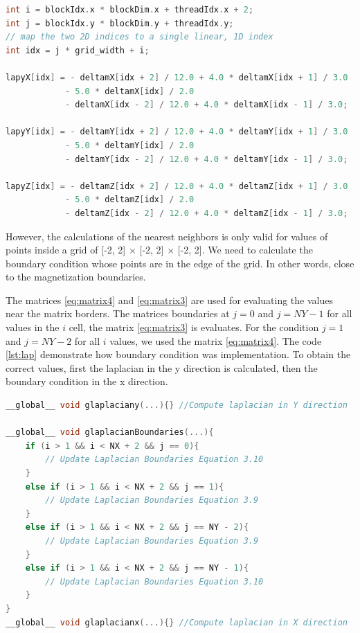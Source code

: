 \begin{lstlisting}[language=C++, label={lst:lpay}, caption={Laplacian evaluation for x, y and z coordinate}]
int i = blockIdx.x * blockDim.x + threadIdx.x + 2;
int j = blockIdx.y * blockDim.y + threadIdx.y;
// map the two 2D indices to a single linear, 1D index
int idx = j * grid_width + i;

lapyX[idx] = - deltamX[idx + 2] / 12.0 + 4.0 * deltamX[idx + 1] / 3.0
			- 5.0 * deltamX[idx] / 2.0
			- deltamX[idx - 2] / 12.0 + 4.0 * deltamX[idx - 1] / 3.0;	
			
lapyY[idx] = - deltamY[idx + 2] / 12.0 + 4.0 * deltamY[idx + 1] / 3.0
			- 5.0 * deltamY[idx] / 2.0
			- deltamY[idx - 2] / 12.0 + 4.0 * deltamY[idx - 1] / 3.0;	
			
lapyZ[idx] = - deltamZ[idx + 2] / 12.0 + 4.0 * deltamZ[idx + 1] / 3.0
			- 5.0 * deltamZ[idx] / 2.0
			- deltamZ[idx - 2] / 12.0 + 4.0 * deltamZ[idx - 1] / 3.0;	
\end{lstlisting}


However, the calculations of the nearest neighbors is only valid for values of points inside a grid of [-2, 2] $\times$ [-2, 2] $\times$ [-2, 2]. We need to calculate the boundary condition whose points are in the edge of the grid. In other words, close to the magnetization boundaries.

 The matrices \ref{eq:matrix4} and \ref{eq:matrix3} are used for evaluating the values near the matrix borders. The matrices boundaries at $j = 0$ and $j = NY - 1$ for all values in the $i$ cell, the matrix \ref{eq:matrix3} is evaluates. For the condition $j = 1$ and $j = NY - 2$ for all $i$ values, we used the matrix \ref{eq:matrix4}. The code \ref{lst:lap} demonstrate how boundary condition was implementation. To obtain the correct values, first the laplacian in the y direction is calculated, then the boundary condition in the x direction. 

\begin{lstlisting}[language=C++, label={lst:lap}, caption={Evaluation of Laplacian X, Y with boundary condition}]
__global__ void glaplaciany(...){} //Compute laplacian in Y direction

__global__ void glaplacianBoundaries(...){
    if (i > 1 && i < NX + 2 && j == 0){
     	// Update Laplacian Boundaries Equation 3.10
    }
    else if (i > 1 && i < NX + 2 && j == 1){
  		// Update Laplacian Boundaries Equation 3.9
    }
    else if (i > 1 && i < NX + 2 && j == NY - 2){
        // Update Laplacian Boundaries Equation 3.9
    }
    else if (i > 1 && i < NX + 2 && j == NY - 1){
        // Update Laplacian Boundaries Equation 3.10
    }
}
__global__ void glaplacianx(...){} //Compute laplacian in X direction
\end{lstlisting}

